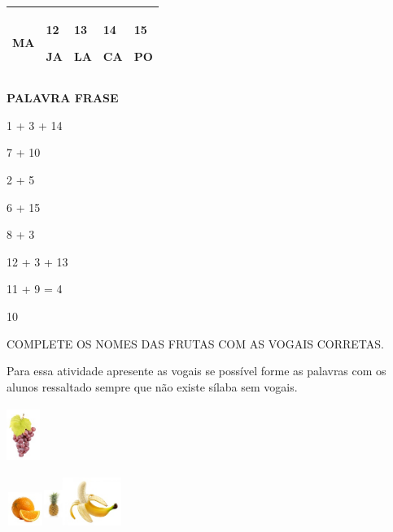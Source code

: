 {{\begin{longtable}[]{@{}lllll@{}}
\begin{minipage}[t]{0.19\columnwidth}
MA\strut
\end{minipage} & \begin{minipage}[t]{0.19\columnwidth}\raggedright\strut
12

JA\strut
\end{minipage} & \begin{minipage}[t]{0.19\columnwidth}\raggedright\strut
13

LA\strut
\end{minipage} & \begin{minipage}[t]{0.19\columnwidth}\raggedright\strut
14

CA\strut
\end{minipage} & \begin{minipage}[t]{0.19\columnwidth}\raggedright\strut
15

PO\strut
\end{minipage}\tabularnewline
\bottomrule
\end{longtable}

\textbf{PALAVRA FRASE}

1 + 3 + 14

7 + 10

2 + 5

6 + 15

8 + 3

12 + 3 + 13

11 + 9 = 4

\num{10}

COMPLETE OS NOMES DAS FRUTAS COM AS VOGAIS CORRETAS.

Para essa atividade apresente as vogais se possível forme as palavras
com os alunos ressaltado sempre que não existe sílaba sem vogais.

\includegraphics[width=0.42675in,height=0.72128in]{media/image69.jpeg}

\includegraphics[width=0.47708in,height=0.42778in]{media/image70.jpeg}\includegraphics[width=0.24167in,height=0.56597in]{media/image71.jpeg}\includegraphics[width=0.74522in,height=0.61494in]{media/image72.jpeg}

}}

